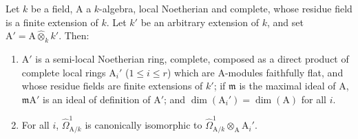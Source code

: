 \begin{lemma}[18.11.4]
\label{IV.18.11.4}
Let $k$ be a field, $\mathrm{A}$ a $k$-algebra, local Noetherian and complete, whose residue field is a finite extension of $k$.
Let $k'$ be an arbitrary extension of $k$, and set $\mathrm{A}'=\mathrm{A}\widehat{\otimes}_kk'$.
Then:
\begin{enumerate}[label=(\roman*)]
  \item $\mathrm{A}'$ is a semi-local Noetherian ring, complete, composed as a direct product of complete local rings $\mathrm{A}_i'$ ($1\leq i\leq r$) which are $\mathrm{A}$-modules faithfully flat, and whose residue fields are finite extensions of $k'$; if $\mathfrak{m}$ is the maximal ideal of $\mathrm{A}$, $\mathfrak{m}\mathrm{A}'$ is an ideal of definition of $\mathrm{A}'$; and $\dim(\mathrm{A}_i')=\dim(\mathrm{A})$ for all $i$.
  \item For all $i$, $\hat{\Omega}^1_{\mathrm{A}/k}$ is canonically isomorphic to $\hat{\Omega}^1_{\mathrm{A}/k}\otimes_{\mathrm{A}}\mathrm{A}_i'$.
\end{enumerate}
\end{lemma}

